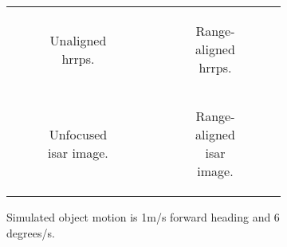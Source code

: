 \documentclass[class=report,11pt,crop=false]{standalone}
\begin{document}
    \begin{figure}[h]
        \begin{minipage}{0.60\linewidth}
            \begin{figure}
                \begin{tabular}{@{}cc@{}}
                    \begin{subfigure}{0.5\linewidth}
                        \centering
                        \resizebox{\linewidth}{!}{}
                        \caption{Unaligned \gls{hrrp}s.\label{subfig:sim_hrrp_1mps}}
                    \end{subfigure}
                    &
                    \begin{subfigure}{0.5\linewidth}
                        \centering
                        \resizebox{\linewidth}{!}{}
                        \caption{Range-aligned \gls{hrrp}s.\label{subfig:corrRA_sim_hrrp}}
                    \end{subfigure}
                    \\
                    \begin{subfigure}{0.5\linewidth}
                        \centering
                        \resizebox{\linewidth}{!}{}
                        \caption{Unfocused \gls{isar} image. \label{subfig:sim_isar_1mps}}
                    \end{subfigure}
                    &
                    \begin{subfigure}{0.5\linewidth}
                        \centering
                        \resizebox{\linewidth}{!}{}
                        \caption{Range-aligned \gls{isar} image. \label{subfig:corrRA_sim_isar}}
                    \end{subfigure}
                \end{tabular}
                \caption{Simulated object motion is 1m/s forward heading and 6 degrees/s. \label{fig:corrRA_sim}}
            \end{figure}
        \end{minipage}
        \hfill
        \begin{minipage}{0.30\linewidth}
            \begin{figure}
                \begin{tabular}{@{}c@{}}

\end{tabular}
\end{figure}
\end{minipage}
\end{figure}
\end{document}
